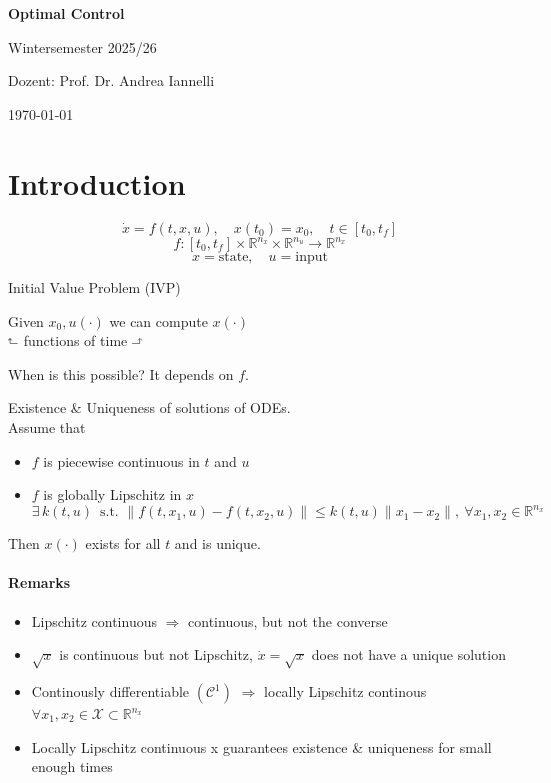 \documentclass[12pt,a4paper,oneside]{scrartcl}
\newenvironment{lemmabox}[1][]{
	\refstepcounter{lemma}
	\begin{tcolorbox}[colback=teal!5!white,
		colframe=teal!60!black,
		fonttitle=\bfseries,
		boxrule=0.8pt,
		arc=3pt,
		left=8pt,right=8pt,top=6pt,bottom=6pt,
		title={Lemma \thelemma\if\relax\detokenize{#1}\relax\else\ (#1)\fi}]
		}{
	\end{tcolorbox}
}
\begin{document}
	
	\begin{titlepage}
		\centering
		\vspace*{3cm}
		{\Huge\bfseries Optimal Control}\par
		\vspace{1.5cm}
		{\Large Wintersemester 2025/26}\par
		\vspace{0.5cm}
		{\Large Dozent: Prof. Dr. Andrea Iannelli}\par
		\vfill
		{\today}
	\end{titlepage}
	
	\tableofcontents
	\clearpage
	
	\section{Introduction}
	\[
	\dot{x} = f(t,x,u), \quad x(t_0)=x_0, \quad t \in [t_0,t_f]
	\]
	\[
	f : [t_0,t_f]\times\mathbb{R}^{n_x}\times\mathbb{R}^{n_u} \to \mathbb{R}^{n_x}
	\]
	\[
	x = \text{state}, \quad u = \text{input}
	\]
	
	Initial Value Problem (IVP)
	
	Given $x_0, u(\cdot)$ we can compute $x(\cdot)$ \\
	\hspace*{23.5mm}$\rotatebox[origin=c]{90}{$\Rsh$}$ functions of time $\rotatebox[origin=c]{270}{$\Lsh$}$
	
	When is this possible? It depends on $f$.
	
	
	\begin{lemmabox}[Sufficient conditions]
		Existence \& Uniqueness of solutions of ODEs.\\
		Assume that
		\begin{itemize}[]
			\item $f$ is piecewise continuous in $t$ and $u$
			\item $f$ is globally Lipschitz in $x$
			\[
			\exists\, k(t,u)\, \text{ s.t. } \|f(t,x_1,u)-f(t,x_2,u)\|\le k(t,u)\|x_1-x_2\|,\ \forall x_1,x_2 \in \mathbb{R}^{n_x}
			\]
		\end{itemize}
		Then $x(\cdot)$ exists for all $t$ and is unique.
	\end{lemmabox}
	
	\paragraph{Remarks}
	\begin{itemize}[noitemsep]
		\item Lipschitz continuous $\Rightarrow$ continuous, but not the converse
		\item $\sqrt{x}$ is continuous but not Lipschitz, $\dot x = \sqrt{x}$ does not have a unique solution
		\item Continously differentiable $(\mathcal{C}^1)$ $\Rightarrow$ locally Lipschitz continous $\forall x_1,x_2 \in \mathcal{X} \subset \mathbb{R}^{n_x}$
		\item Locally Lipschitz continuous x guarantees existence \& uniqueness for small enough times
	\end{itemize}
	
\end{document}
